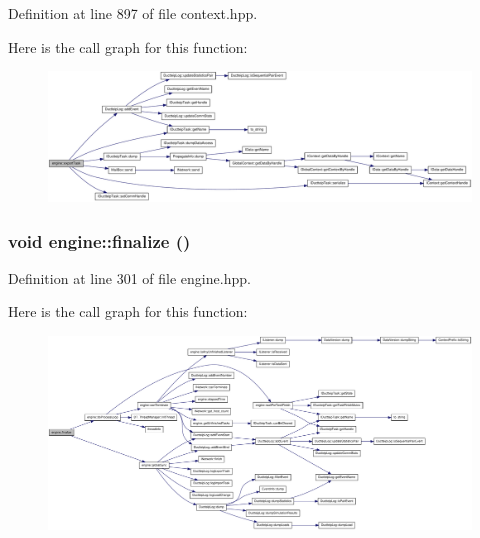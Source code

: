 Definition at line 897 of file context.hpp.

Here is the call graph for this function:\nopagebreak
\begin{figure}[H]
\begin{center}
\leavevmode
\includegraphics[width=420pt]{classengine_ab64370db1774805a8fbe041bdde1a01c_cgraph}
\end{center}
\end{figure}
\hypertarget{classengine_abe42ab122f70fe47049ad8c1170651a4}{
\subsubsection[{finalize}]{\setlength{\rightskip}{0pt plus 5cm}void engine::finalize ()}}
\label{classengine_abe42ab122f70fe47049ad8c1170651a4}


Definition at line 301 of file engine.hpp.

Here is the call graph for this function:\nopagebreak
\begin{figure}[H]
\begin{center}
\leavevmode
\includegraphics[width=420pt]{classengine_abe42ab122f70fe47049ad8c1170651a4_cgraph}
\end{center}
\end{figure}


